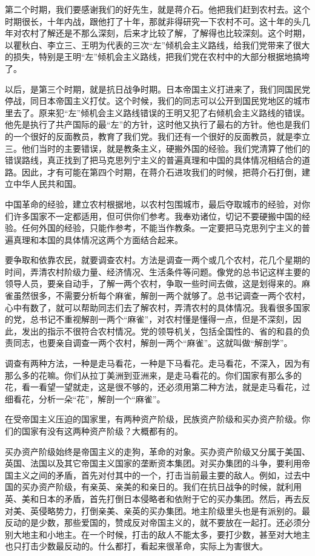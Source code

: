 第二个时期，我们要感谢我们的好先生，就是蒋介石。他把我们赶到农村去。这个时期很长，十年内战，跟他打了十年，那就非得研究一下农村不可。这十年的头几年对农村了解还是不那么深刻，后来才比较了解，了解得也比较深刻。这个时期，以瞿秋白、李立三、王明为代表的三次“左”倾机会主义路线，给我们党带来了很大的损失，特别是王明“左”倾机会主义路线，把我们党在农村中的大部分根据地搞垮了。

以后，是第三个时期，就是抗日战争时期。日本帝国主义打进来了，我们同国民党停战，同日本帝国主义打仗。这个时候，我们的同志可以公开到国民党地区的城市里去了。原来犯“左”倾机会主义路线错误的王明又犯了右倾机会主义路线的错误。他先是执行了共产国际的最“左”的方针，这时他又执行了最右的方针。他也是我们的一个很好的反面教员，教育了我们党。我们还有一个很好的反面教员，就是李立三。他们当时的主要错误，就是教条主义，硬搬外国的经验。我们党清算了他们的错误路线，真正找到了把马克思列宁主义的普遍真理和中国的具体情况相结合的道路。因此，才有可能在第四个时期，在蒋介石进攻我们的时候，把蒋介石打倒，建立中华人民共和国。

中国革命的经验，建立农村根据地，以农村包围城市，最后夺取城市的经验，对你们许多国家不一定都适用，但可供你们参考。我奉劝诸位，切记不要硬搬中国的经验。任何外国的经验，只能作参考，不能当作教条。一定要把马克思列宁主义的普遍真理和本国的具体情况这两个方面结合起来。

要争取和依靠农民，就要调查农村。方法是调查一两个或几个农村，花几个星期的时间，弄清农村阶级力量、经济情况、生活条件等问题。像党的总书记这样主要的领导人员，要亲自动手，了解一两个农村，争取一些时间去做，这是划得来的。麻雀虽然很多，不需要分析每个麻雀，解剖一两个就够了。总书记调查一两个农村，心中有数了，就可以帮助同志们去了解农村，弄清农村的具体情况。我看很多国家的党，总书记不重视解剖一两个“麻雀”，对农村懂是懂得一点，但是不深刻，因此，发出的指示不很符合农村情况。党的领导机关，包括全国性的、省的和县的负责同志，也要亲自调查一两个农村，解剖一两个“麻雀”。这就叫做“解剖学”。

调查有两种方法，一种是走马看花，一种是下马看花。走马看花，不深入，因为有那么多的花嘛。你们从拉丁美洲到亚洲来，是走马看花的。你们国家有那么多的花，看一看望一望就走，这是很不够的，还必须用第二种方法，就是走马看花，过细看花，分析一朵“花”，解剖一个“麻雀”。

在受帝国主义压迫的国家里，有两种资产阶级，民族资产阶级和买办资产阶级。你们的国家有没有这两种资产阶级？大概都有的。

买办资产阶级始终是帝国主义的走狗，革命的对象。买办资产阶级又分属于美国、英国、法国以及其它帝国主义国家的垄断资本集团。对买办集团的斗争，要利用帝国主义之间的矛盾，首先对付其中的一个，打击当前最主要的敌人。例如，过去中国的买办资产阶级，有亲英、亲美的和亲日的。我们在抗日战争的时候，就利用英、美和日本的矛盾，首先打倒日本侵略者和依附于它的买办集团。然后，再去反对美、英侵略势力，打倒亲美、亲英的买办集团。地主阶级里头也是有派别的。最反动的是少数，那些爱国的，赞成反对帝国主义的，就不要放在一起打。还必须分别大地主和小地主。在一个时候，打击的敌人不能太多，要打少数，甚至对大地主也只打击少数最反动的。什么都打，看起来很革命，实际上为害很大。

